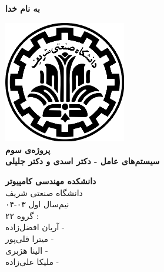 \documentclass[12pt]{article}
\begin{document}
\begin{titlepage}
	\begin{center}
		\textbf{ \Huge{به نام خدا}}
	
		\vspace{0.2cm}
	
		\includegraphics[width=0.4\textwidth]{sharif.png}\\
		\vspace{0.2cm}
		\textbf{ \Huge{پروژه‌ی سوم}}\\
		\vspace{0.25cm}
		\textbf{ \Large{سیستم‌های عامل - دکتر اسدی و دکتر جلیلی}}
		\vspace{0.2cm}
		
		
		\large \textbf{دانشکده مهندسی کامپیوتر}\\\vspace{0.1cm}
		\large   دانشگاه صنعتی شریف\\\vspace{0.2cm}
		\large   ﻧﯿﻢ‌سال اول ۰۳-۰۴ \\\vspace{0.10cm}
		\large{گروه ۲۲ :}\\
		\large{آریان افضل‌زاده - }\\
		\large{میترا قلی‌پور - }\\
		\large{الینا هژبری - }\\
		\large{ملیکا علی‌زاده - }\\
	\end{center}
\end{titlepage}

\newpage

\pagestyle{fancy}
\fancyhf{}
\fancyfoot{}
\setlength{\headheight}{59pt}
\cfoot{\thepage}
\end{document}
